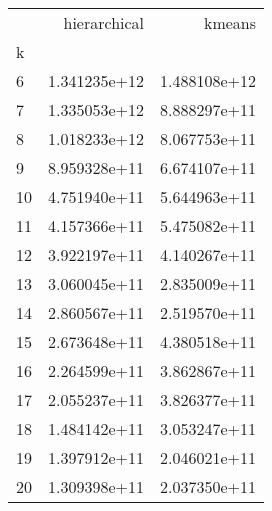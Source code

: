 \begin{tabular}{lrr}
\toprule
{} &  hierarchical &        kmeans \\
k  &               &               \\
\midrule
6  &  1.341235e+12 &  1.488108e+12 \\
7  &  1.335053e+12 &  8.888297e+11 \\
8  &  1.018233e+12 &  8.067753e+11 \\
9  &  8.959328e+11 &  6.674107e+11 \\
10 &  4.751940e+11 &  5.644963e+11 \\
11 &  4.157366e+11 &  5.475082e+11 \\
12 &  3.922197e+11 &  4.140267e+11 \\
13 &  3.060045e+11 &  2.835009e+11 \\
14 &  2.860567e+11 &  2.519570e+11 \\
15 &  2.673648e+11 &  4.380518e+11 \\
16 &  2.264599e+11 &  3.862867e+11 \\
17 &  2.055237e+11 &  3.826377e+11 \\
18 &  1.484142e+11 &  3.053247e+11 \\
19 &  1.397912e+11 &  2.046021e+11 \\
20 &  1.309398e+11 &  2.037350e+11 \\
\bottomrule
\end{tabular}
